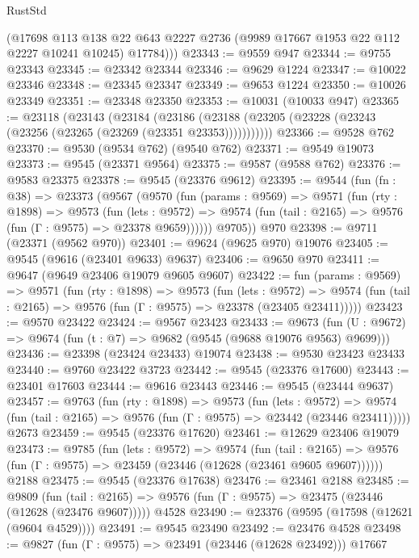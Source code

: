\begin{lexlean}{RustStd}
\begin{coremodule}
        (@17698
          @113
          @138
          @22
          @643
          @2227
          @2736
          (@9989 @17667 @1953 @22 @112 @2227 @10241 @10245)
          @17784)))
@23343 := @9559 @947
@23344 := @9755 @23343
@23345 := @23342 @23344
@23346 := @9629 @1224
@23347 := @10022 @23346
@23348 := @23345 @23347
@23349 := @9653 @1224
@23350 := @10026 @23349
@23351 := @23348 @23350
@23353 := @10031 (@10033 @947)
@23365 := @23118
    (@23143
      (@23184
        (@23186 (@23188 (@23205 (@23228 (@23243 (@23256 (@23265 (@23269 (@23351 @23353)))))))))))
@23366 := @9528 @762
@23370 := @9530 (@9534 @762) (@9540 @762)
@23371 := @9549 @19073
@23373 := @9545 (@23371 @9564)
@23375 := @9587 (@9588 @762)
@23376 := @9583 @23375
@23378 := @9545 (@23376 @9612)
@23395 := @9544
    (fun (fn : @38) =>
    @23373
      (@9567
        (@9570
          (fun (params : @9569) =>
          @9571
            (fun (rty : @1898) =>
            @9573
              (fun (lets : @9572) =>
              @9574 (fun (tail : @2165) => @9576 (fun (Γ : @9575) => @23378 @9659))))))
        @9705))
    @970
@23398 := @9711 (@23371 (@9562 @970))
@23401 := @9624 (@9625 @970) @19076
@23405 := @9545 (@9616 (@23401 @9633) @9637)
@23406 := @9650 @970
@23411 := @9647 (@9649 @23406 @19079 @9605 @9607)
@23422 := fun (params : @9569) =>
  @9571
    (fun (rty : @1898) =>
    @9573
      (fun (lets : @9572) =>
      @9574 (fun (tail : @2165) => @9576 (fun (Γ : @9575) => @23378 (@23405 @23411)))))
@23423 := @9570 @23422
@23424 := @9567 @23423
@23433 := @9673
    (fun (U : @9672) => @9674 (fun (t : @7) => @9682 (@9545 (@9688 @19076 @9563) @9699)))
@23436 := @23398 (@23424 @23433) @19074
@23438 := @9530 @23423 @23433
@23440 := @9760 @23422 @3723
@23442 := @9545 (@23376 @17600)
@23443 := @23401 @17603
@23444 := @9616 @23443
@23446 := @9545 (@23444 @9637)
@23457 := @9763
    (fun (rty : @1898) =>
    @9573
      (fun (lets : @9572) =>
      @9574 (fun (tail : @2165) => @9576 (fun (Γ : @9575) => @23442 (@23446 @23411)))))
    @2673
@23459 := @9545 (@23376 @17620)
@23461 := @12629 @23406 @19079
@23473 := @9785
    (fun (lets : @9572) =>
    @9574
      (fun (tail : @2165) =>
      @9576 (fun (Γ : @9575) => @23459 (@23446 (@12628 (@23461 @9605 @9607))))))
    @2188
@23475 := @9545 (@23376 @17638)
@23476 := @23461 @2188
@23485 := @9809
    (fun (tail : @2165) => @9576 (fun (Γ : @9575) => @23475 (@23446 (@12628 (@23476 @9607)))))
    @4528
@23490 := @23376 (@9595 (@17598 (@12621 (@9604 @4529))))
@23491 := @9545 @23490
@23492 := @23476 @4528
@23498 := @9827 (fun (Γ : @9575) => @23491 (@23446 (@12628 @23492))) @17667

\end{coremodule}
\end{lexlean}
